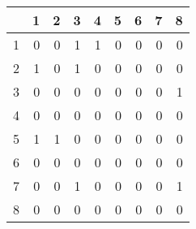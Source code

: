 \begin{table}[ht]
\centering
\begin{tabular}{rrrrrrrrr}
  \hline
 & 1 & 2 & 3 & 4 & 5 & 6 & 7 & 8 \\ 
  \hline
1 & 0 & 0 & 1 & 1 & 0 & 0 & 0 & 0 \\ 
  2 & 1 & 0 & 1 & 0 & 0 & 0 & 0 & 0 \\ 
  3 & 0 & 0 & 0 & 0 & 0 & 0 & 0 & 1 \\ 
  4 & 0 & 0 & 0 & 0 & 0 & 0 & 0 & 0 \\ 
  5 & 1 & 1 & 0 & 0 & 0 & 0 & 0 & 0 \\ 
  6 & 0 & 0 & 0 & 0 & 0 & 0 & 0 & 0 \\ 
  7 & 0 & 0 & 1 & 0 & 0 & 0 & 0 & 1 \\ 
  8 & 0 & 0 & 0 & 0 & 0 & 0 & 0 & 0 \\ 
   \hline
\end{tabular}
\end{table}
